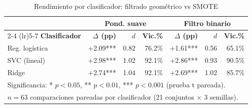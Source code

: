 \begin{table}[htbp]
\centering
\caption{Rendimiento por clasificador: filtrado geométrico vs SMOTE}
\label{tab:modern_classifier}
\begin{tabular}{lrrrrrr}
\toprule
 & \multicolumn{3}{c}{\textbf{Pond. suave}} & \multicolumn{3}{c}{\textbf{Filtro binario}} \\
\cmidrule(lr){2-4} \cmidrule(lr){5-7}
\textbf{Clasificador} & \textbf{$\Delta$ (pp)} & \textbf{$d$} & \textbf{Vic.\%} & \textbf{$\Delta$ (pp)} & \textbf{$d$} & \textbf{Vic.\%} \\
\midrule
Reg. logística & +2.09*** & 0.82 & 76.2\% & +1.61*** & 0.56 & 65.1\% \\
SVC (lineal)   & +2.98*** & 1.02 & 92.1\% & +2.86*** & 0.93 & 90.5\% \\
Ridge          & +2.74*** & 1.04 & 92.1\% & +2.69*** & 1.02 & 85.7\% \\
\midrule
\multicolumn{7}{l}{\small Significancia: * $p<0.05$, ** $p<0.01$, *** $p<0.001$ (prueba t pareada).} \\
\multicolumn{7}{l}{\small $n=63$ comparaciones pareadas por clasificador (21 conjuntos $\times$ 3 semillas).} \\
\bottomrule
\end{tabular}
\end{table}